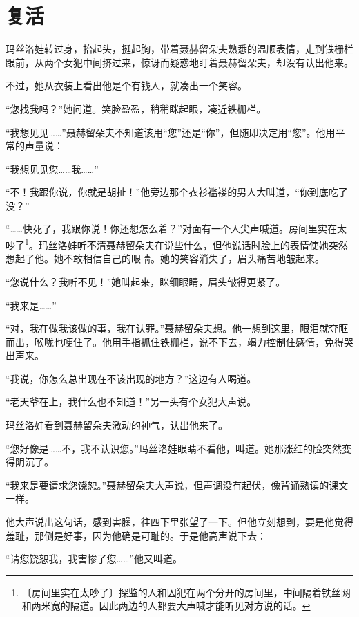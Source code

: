 \documentclass[12pt,UTF-8,openany]{ctexbook}
\begin{document}
\chapter{复活}

\begin{normalsize}
    
    玛丝洛娃转过身，抬起头，挺起胸，带着聂赫留朵夫熟悉的温顺表情，走到铁栅栏跟前，从两个女犯中间挤过来，惊讶而疑惑地盯着聂赫留朵夫，却没有认出他来。
    
    不过，她从衣装上看出他是个有钱人，就凑出一个笑容。
    
    “您找我吗？”她问道。笑脸盈盈，稍稍眯起眼，凑近铁栅栏。
    
    “我想见见……”聂赫留朵夫不知道该用“您”还是“你”，但随即决定用“您”。他用平常的声量说：
    
    “我想见见您……我……”
    
    “不！我跟你说，你就是胡扯！”他旁边那个衣衫褴褛的男人大叫道，“你到底吃了没？”
    
    “……快死了，我跟你说！你还想怎么着？”对面有一个人尖声喊道。房间里实在太吵了\footnote{〔房间里实在太吵了〕探监的人和囚犯在两个分开的房间里，中间隔着铁丝网和两米宽的隔道。因此两边的人都要大声喊才能听见对方说的话。}。玛丝洛娃听不清聂赫留朵夫在说些什么，但他说话时脸上的表情使她突然想起了他。她不敢相信自己的眼睛。她的笑容消失了，眉头痛苦地皱起来。
    
    “您说什么？我听不见！”她叫起来，眯细眼睛，眉头皱得更紧了。
    
    “我来是……”
    
    “对，我在做我该做的事，我在认罪。”聂赫留朵夫想。他一想到这里，眼泪就夺眶而出，喉咙也哽住了。他用手指抓住铁栅栏，说不下去，竭力控制住感情，免得哭出声来。
    
    “我说，你怎么总出现在不该出现的地方？”这边有人喝道。
    
    “老天爷在上，我什么也不知道！”另一头有个女犯大声说。
    
    玛丝洛娃看到聂赫留朵夫激动的神气，认出他来了。
    
    “您好像是……不，我不认识您。”玛丝洛娃眼睛不看他，叫道。她那涨红的脸突然变得阴沉了。
    
    “我来是要请求您饶恕。”聂赫留朵夫大声说，但声调没有起伏，像背诵熟读的课文一样。
    
    他大声说出这句话，感到害臊，往四下里张望了一下。但他立刻想到，要是他觉得羞耻，那倒是好事，因为他确是可耻的。于是他高声说下去：
    
    “请您饶恕我，我害惨了您……”他又叫道。
    

\end{normalsize}
\end{document}
